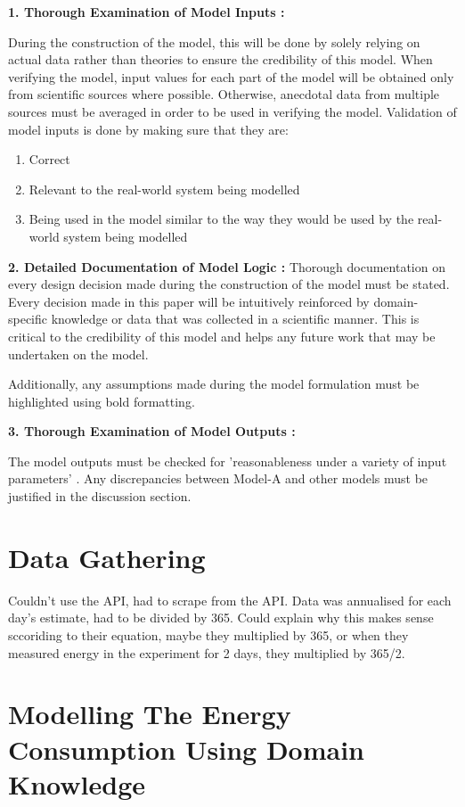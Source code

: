 \textbf{1. Thorough Examination of Model Inputs :}

During the construction of the model, this will be done by solely relying on actual data rather than theories to ensure the credibility of this model. When verifying the model, input values for each part of the model will be obtained only from scientific sources where possible. Otherwise, anecdotal data from multiple sources must be averaged in order to be used in verifying the model. Validation of model inputs is done by making sure that they are:
\begin{enumerate}
    \item Correct
    \item Relevant to the real-world system being modelled
    \item Being used in the model similar to the way they would be used by the real-world system being modelled
\end{enumerate}  


\textbf{2. Detailed Documentation of Model Logic :}
Thorough documentation on every design decision made during the construction of the model must be stated. Every decision made in this paper will be intuitively reinforced by domain-specific knowledge or data that was collected in a scientific manner. This is critical to the credibility of this model and helps any future work that may be undertaken on the model.

Additionally, any assumptions made during the model formulation must be highlighted using bold formatting.


\textbf{3. Thorough Examination of Model Outputs :}

The model outputs must be checked for 'reasonableness under a variety of input parameters' \cite{Al-Aomar2015ModelTechniques}. Any discrepancies between Model-A and other models must be justified in the discussion section.   


\section {Data Gathering}

Couldn't use the API, had to scrape from the API. Data was annualised for each day's estimate, had to be divided by 365. Could explain why this makes sense sccoriding to their equation, maybe they multiplied by 365, or when they measured energy in the experiment for 2 days, they multiplied by 365/2.

\section {Modelling The Energy Consumption Using Domain Knowledge}

